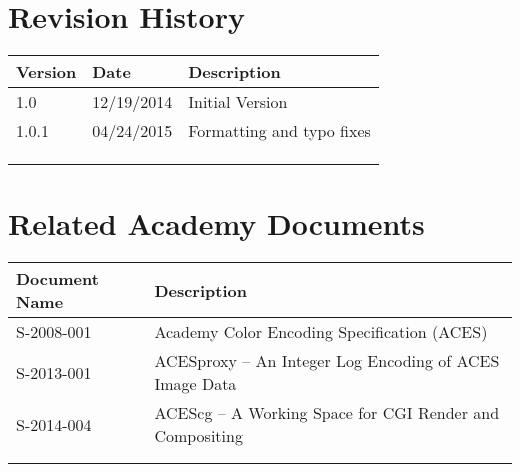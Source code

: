\prelimsectionformat	%
\chapter{Revision History}

\begin{tabularx}{\linewidth}{|l|l|X|}
    \hline
    Version & Date & Description \\ \hline
    1.0     & 12/19/2014     & Initial Version      \\ \hline
    1.0.1   & 04/24/2015     & Formatting and typo fixes \\ \hline
            &      &             \\ \hline
            &      &             \\ \hline
            &      &             \\ \hline
\end{tabularx}

\vspace{0.25in} %
\chapter{Related Academy Documents} %
\begin{tabularx}{\linewidth}{|l|X|}
    \hline
    Document Name & Description  \\ \hline
    S-2008-001 & Academy Color Encoding Specification (ACES) \\ \hline
    S-2013-001 & ACESproxy -- An Integer Log Encoding of ACES Image Data \\ \hline
    S-2014-004 & ACEScg -- A Working Space for CGI Render and Compositing             \\ \hline
    & \\ \hline
    & \\ \hline
\end{tabularx}